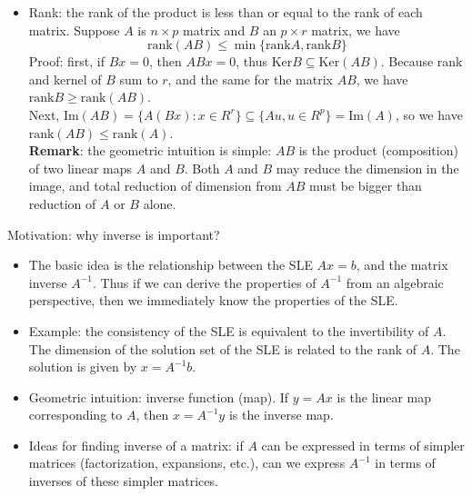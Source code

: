 \documentclass{report}
\begin{document}
\begin{itemize}
\item Rank: the rank of the product is less than or equal to the rank of each matrix. Suppose $A$ is $n \times p$ matrix and $B$ an $p \times r$ matrix, we have
\begin{equation}
\text{rank}(AB) \leq \min \{\text{rank}A, \text{rank}B\}
\end{equation}
Proof: first, if $Bx = 0$, then $ABx = 0$, thus $\text{Ker}B \subseteq \text{Ker}(AB)$. Because rank and kernel of $B$ sum to $r$, and the same for the matrix $AB$, we have $\text{rank}B \geq \text{rank}(AB)$. \\
Next, $\text{Im}(AB) = \{A(Bx): x \in R^r \} \subseteq \{Au, u \in R^p\} = \text{Im}(A)$, so we have $\text{rank}(AB) \leq \text{rank}(A)$. \\
\textbf{Remark}: the geometric intuition is simple: $AB$ is the product (composition) of two linear maps $A$ and $B$. Both $A$ and $B$ may reduce the dimension in the image, and total reduction of dimension from $AB$ must be bigger than reduction of $A$ or $B$ alone. 

\end{itemize}

Motivation: why inverse is important? 
\begin{itemize}
\item The basic idea is the relationship between the SLE $Ax = b$, and the matrix inverse $A^{-1}$. Thus if we can derive the properties of $A^{-1}$ from an algebraic perspective, then we immediately know the properties of the SLE.  

\item Example: the consistency of the SLE is equivalent to the invertibility of $A$. The dimension of the solution set of the SLE is related to the rank of $A$. The solution is given by $x = A^{-1} b$.

\item Geometric intuition: inverse function (map). If $y = Ax$ is the linear map corresponding to $A$, then $x = A^{-1}y$ is the inverse map.

\item Ideas for finding inverse of a matrix: if $A$ can be expressed in terms of simpler matrices (factorization, expansions, etc.), can we express $A^{-1}$ in terms of inverses of these simpler matrices.   
\end{itemize}
\end{document}
